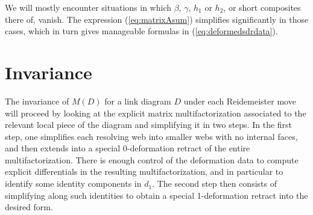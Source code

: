 \documentclass{article}
\theoremstyle{plain} %
\theoremstyle{definition} %
\theoremstyle{remark} %
\begin{document}
We will mostly encounter situations in which $\beta$, $\gamma$, $h_1$ or $h_2$, or short composites there of, vanish. The expression (\ref{eq:matrixAsum}) simplifies significantly in those cases, which in turn gives manageable formulas in (\ref{eq:deformedsdrdata}).







\section{Invariance}

The invariance of $M(D)$ for a link diagram $D$ under each Reidemeister move will proceed by looking at the explicit matrix multifactorization associated to the relevant local piece of the diagram and simplifying it in two steps. In the first step, one simplifies each resolving web into smaller webs with no internal faces, and then extends into a special 0-deformation retract of the entire multifactorization. There is enough control of the deformation data to compute explicit differentials in the resulting multifactorization, and in particular to identify some identity components in $d_1$. The second step then consists of simplifying along such identities to obtain a special 1-deformation retract into the desired form.
\end{document}
